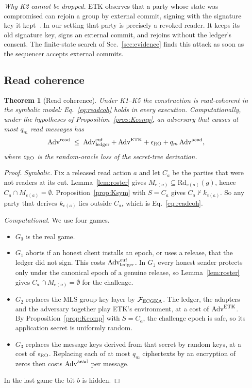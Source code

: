 \documentclass[aps,prx,reprint,superscriptaddress,nofootinbib,floatfix]{revtex4-2}
\newtheorem{theorem}{Theorem}
\theoremstyle{remark}
\newcommand{\Rd}{\mathrm{Rd}}             %
\newcommand{\cut}{v}                      %
\newcommand{\roster}{M}
\newcommand{\derives}{\vdash}
\newcommand{\Adv}{\mathrm{Adv}}
\begin{document}
\emph{Why K2 cannot be dropped.} ETK observes that a party whose state was compromised can rejoin a group by external commit, signing with the signature key it kept~\cite{etk}. In our setting that party is precisely a revoked reader. It keeps its old signature key, signs an external commit, and rejoins without the ledger's consent. The finite-state search of Sec.~\ref{sec:evidence} finds this attack as soon as the sequencer accepts external commits.

\subsection{Read coherence}

\begin{theorem}[Read coherence]\label{thm:read}
Under K1--K5 the construction is read-coherent in the symbolic model: Eq.~\eqref{eq:readcoh} holds in every execution. Computationally, under the hypotheses of Proposition~\ref{prop:Kcomp}, an adversary that causes at most $q_m$ read messages has
\begin{equation}
\Adv^{\rm read}\;\le\;\Adv^{\rm euf}_{\rm ledger}+\Adv^{\rm ETK}+\epsilon_{\rm RO}+q_m\,\Adv^{\rm aead},
\label{eq:readbound}
\end{equation}
where $\epsilon_{\rm RO}$ is the random-oracle loss of the secret-tree derivation.
\end{theorem}
\begin{proof}
\emph{Symbolic.} Fix a released read action $a$ and let $C_a$ be the parties that were not readers at its cut. Lemma~\ref{lem:roster} gives $\roster_{e(a)}\subseteq\Rd_{\cut(a)}(g)$, hence $C_a\cap\roster_{e(a)}=\emptyset$. Proposition~\ref{prop:Ksym} with $S=C_a$ gives $C_a\not\derives k_{e(a)}$. So any party that derives $k_{e(a)}$ lies outside $C_a$, which is Eq.~\eqref{eq:readcoh}.

\emph{Computational.} We use four games.
\begin{itemize}
\item $G_0$ is the real game.
\item $G_1$ aborts if an honest client installs an epoch, or uses a release, that the ledger did not sign. This costs $\Adv^{\rm euf}_{\rm ledger}$. In $G_1$ every honest sender protects only under the canonical epoch of a genuine release, so Lemma~\ref{lem:roster} gives $C_a\cap\roster_{e(a)}=\emptyset$ for the challenge.
\item $G_2$ replaces the MLS group-key layer by $\mathcal F_{\rm ECGKA}$. The ledger, the adapters and the adversary together play ETK's environment, at a cost of $\Adv^{\rm ETK}$. By Proposition~\ref{prop:Kcomp} with $S=C_a$, the challenge epoch is safe, so its application secret is uniformly random.
\item $G_3$ replaces the message keys derived from that secret by random keys, at a cost of $\epsilon_{\rm RO}$. Replacing each of at most $q_m$ ciphertexts by an encryption of zeros then costs $\Adv^{\rm aead}$ per message.
\end{itemize}
In the last game the bit $b$ is hidden.
\end{proof}
\end{document}
